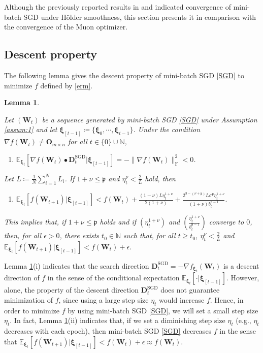 \documentclass[twoside,11pt]{article}
\newtheorem{lem}{Lemma}[section]
\begin{document}
Although the previously reported results in \citep[Theorem 4]{fatkhullin2025can} and \citep[Theorem 3.5]{yamada_2026} indicated convergence of mini-batch SGD under H\"{o}lder smoothness, this section presents it in comparison with the convergence of the Muon optimizer. 

\subsection{Descent property}
The following lemma gives the descent property of mini-batch SGD \eqref{SGD} to minimize $f$ defined by \eqref{erm}. 

\begin{lem}\label{lem:sgd_descent}
{\em 
Let $(\bm{W}_t)$ be a sequence generated by mini-batch SGD \eqref{SGD} under Assumption \ref{assum:1} and let $\bm{\xi}_{[t-1]} \coloneqq \{ \bm{\xi}_0, \cdots, \bm{\xi}_{t-1} \}$. Under the condition $\nabla f (\bm{W}_t) \neq \bm{O}_{m \times n}$ for all $t \in \{0\} \cup \mathbb{N}$,
\begin{enumerate}
\item[(i)]
$\displaystyle{
\mathbb{E}_{\bm{\xi}_t} \left[\nabla f (\bm{W}_t) \bullet \bm{D}_t^{\mathrm{SGD}}|\bm{\xi}_{[t-1]} \right] = - \|\nabla f (\bm{W}_t)\|_{\mathrm{F}}^2 < 0
}$.
\end{enumerate}
Let $L \coloneqq \frac{1}{N} \sum_{i=1}^N L_i$. If $1 + \nu \leq \mathfrak{p}$ and $\eta_t^{\nu} < \frac{2}{L}$ hold, then
\begin{enumerate}
\item[(ii)] 
$\displaystyle{
\mathbb{E}_{\bm{\xi}_t} \left[f (\bm{W}_{t+1}) |\bm{\xi}_{[t-1]} \right] 
<
f(\bm{W}_{t}) 
+ \frac{(1 - \nu) L \eta_t^{1 + \nu}}{2 (1 + \nu)}
+ \frac{2^{3 - (\nu + \mathfrak{p})} L \sigma^{\mathfrak{p}} \eta_t^{1 + \nu}}{(1 + \nu) b_t^{\mathfrak{p}-1}}. 
}$
\end{enumerate}
This implies that, if $1 + \nu \leq \mathfrak{p}$ holds and if $(\eta_t^{1 + \nu})$ and $(\frac{\eta_t^{1 + \nu}}{b_t^{\mathfrak{p}-1}})$ converge to $0$, then, for all $\epsilon > 0$, there exists $t_0 \in \mathbb{N}$ such that, for all $t \geq t_0$, $\eta_t^{\nu} < \frac{2}{L}$ and $\mathbb{E}_{\bm{\xi}_t} \left[f (\bm{W}_{t+1}) |\bm{\xi}_{[t-1]} \right] < f(\bm{W}_t) + \epsilon$.}
\end{lem}

Lemma \ref{lem:sgd_descent}(i) indicates that the search direction $\bm{D}_t^{\mathrm{SGD}} = - \nabla f_{\bm{\xi}_t} (\bm{W}_t)$ is a descent direction of $f$ in the sense of the conditional expectation $\mathbb{E}_{\bm{\xi}_t}[\cdot | \bm{\xi}_{[t-1]}]$. However, alone, the property of the descent direction $\bm{D}_t^{\mathrm{SGD}}$ does not guarantee minimization of $f$, since using a large step size $\eta_t$ would increase $f$. Hence, in order to minimize $f$ by using mini-batch SGD \eqref{SGD}, we will set a small step size $\eta_t$. In fact, Lemma \ref{lem:sgd_descent}(ii) indicates that, if we set a diminishing step size $\eta_t$ (e.g., $\eta_t$ decreases with each epoch), then mini-batch SGD \eqref{SGD} decreases $f$ in the sense that $\mathbb{E}_{\bm{\xi}_t} \left[f (\bm{W}_{t+1}) |\bm{\xi}_{[t-1]} \right] < f(\bm{W}_t) + \epsilon \approx f(\bm{W}_t)$.
\end{document}
